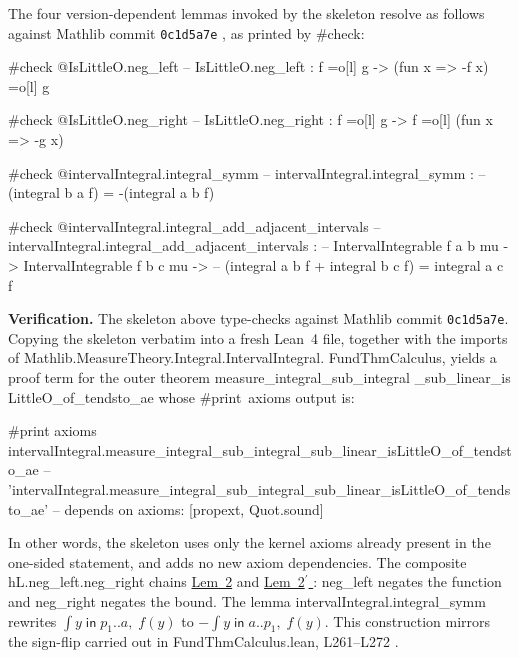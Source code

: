 \documentclass[11pt,reqno]{amsart}
\begin{document}
\noindent The four version-dependent lemmas invoked by the skeleton resolve
as follows against Mathlib commit \texttt{0c1d5a7e}{} , as printed by 
\textsf{\#check}:

\text{ \ } \text{ \ } 
\begin{verbatimbox}
#check @IsLittleO.neg_left
-- IsLittleO.neg_left : f =o[l] g -> (fun x => -f x) =o[l] g

#check @IsLittleO.neg_right
-- IsLittleO.neg_right : f =o[l] g -> f =o[l] (fun x => -g x)

#check @intervalIntegral.integral_symm
-- intervalIntegral.integral_symm :
--   (integral b a f) = -(integral a b f)

#check @intervalIntegral.integral_add_adjacent_intervals
-- intervalIntegral.integral_add_adjacent_intervals :
--   IntervalIntegrable f a b mu -> IntervalIntegrable f b c mu ->
--     (integral a b f + integral b c f) = integral a c f
\end{verbatimbox}
\text{ \ } \text{ \ }

\noindent\textbf{Verification.} The skeleton above type-checks against
Mathlib commit \texttt{0c1d5a7e}{}. Copying the skeleton verbatim into a
fresh Lean~4 file, together with the imports of \textsf{%
Mathlib.MeasureTheory.\allowbreak Integral.IntervalIntegral.\allowbreak
FundThmCalculus}, yields a proof term for the outer theorem \textsf{%
measure\allowbreak\_integral\allowbreak\_sub\allowbreak\_integral\allowbreak
\_sub\allowbreak\_linear\allowbreak\_is\allowbreak
LittleO\allowbreak\_of\allowbreak \_tendsto\allowbreak\_ae} whose \textsf{%
\#print\ axioms} output is:

\text{ \ } \text{ \ } 
\begin{verbatimbox}
#print axioms
  intervalIntegral.measure_integral_sub_integral_sub_linear_isLittleO_of_tendsto_ae
-- 'intervalIntegral.measure_integral_sub_integral_sub_linear_isLittleO_of_tendsto_ae'
--   depends on axioms: [propext, Quot.sound]
\end{verbatimbox}
\text{ \ } \text{ \ }

\noindent In other words, the skeleton uses only the kernel axioms already
present in the one-sided statement, and adds no new axiom dependencies. The
composite \textsf{hL.neg\allowbreak\_left.neg\allowbreak\_right} chains 
\hyperlink{lem:negleft}{Lem~2} and \hyperlink{lem:negright}{Lem~2$^{\prime }$%
}: \textsf{neg\allowbreak\_left} negates the function and \textsf{%
neg\allowbreak\_right} negates the bound. The lemma \textsf{%
interval\allowbreak Integral.integral\allowbreak\_symm} rewrites $\int y \;%
\mathsf{in}\;p_1..a,\;f(y)$ to $-\int y \;\mathsf{in}\;a..p_1,\;f(y)$. This
construction mirrors the sign-flip carried out in \textsf{%
FundThmCalculus.lean}, L261--L272 \cite{mathlib4-fundthm}.
\end{document}

